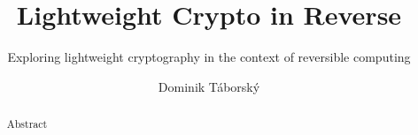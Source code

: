 \documentclass[a4paper,10pt,openright]{memoir}
\begin{document}
\thesiscomment{} %
\title{Lightweight Crypto in Reverse}
\subtitle{Exploring lightweight cryptography in the context of reversible computing}
\author{Dominik Táborský}

\pagestyle{plain}
\maketitle

\cleardoublepage
{}
\setcounter{page}{3}

\cleardoublepage
\pagestyle{plain}
\begin{abstract}
Abstract
\end{abstract}


\cleardoublepage
{}
\tableofcontents*


\cleardoublepage
{}
\setcounter{page}{1}






\cleardoublepage



\cleardoublepage
\end{document}
